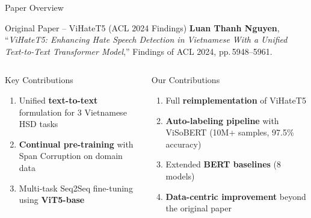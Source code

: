 \documentclass[10pt, aspectratio=169]{beamer}
\begin{document}
\begin{frame}[shrink=5]{Paper Overview}
  \begin{block}{Original Paper -- ViHateT5 (ACL 2024 Findings)}
    \textbf{Luan Thanh Nguyen}, ``\textit{ViHateT5: Enhancing Hate Speech Detection in Vietnamese With a Unified Text-to-Text Transformer Model},'' Findings of ACL 2024, pp.\,5948--5961.
  \end{block}
  \vspace{0.2cm}

  \begin{columns}[T]
    \begin{block}{Key Contributions}
      \begin{enumerate}
        \item Unified \textbf{text-to-text} formulation for 3 Vietnamese HSD tasks
        \item \textbf{Continual pre-training} with Span Corruption on domain data
        \item Multi-task Seq2Seq fine-tuning using \textbf{ViT5-base}
      \end{enumerate}
    \end{block}

    \begin{exampleblock}{Our Contributions}
      \begin{enumerate}
        \item Full \textbf{reimplementation} of ViHateT5
        \item \textbf{Auto-labeling pipeline} with ViSoBERT (10M+ samples, 97.5\% accuracy)
        \item Extended \textbf{BERT baselines} (8 models)
        \item \textbf{Data-centric improvement} beyond the original paper
      \end{enumerate}
    \end{exampleblock}
  \end{columns}
\end{frame}
\end{document}
